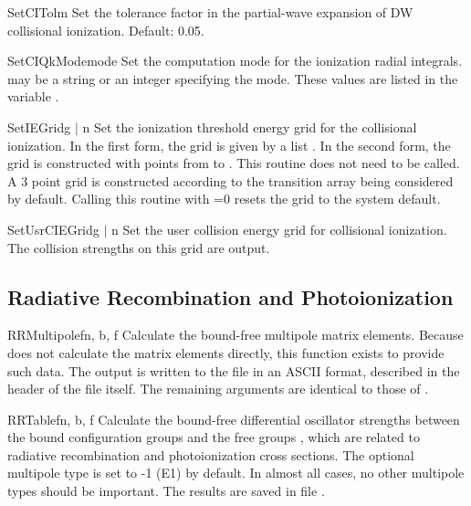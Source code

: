 \begin{fundesc}{SetCITol}{m}
Set the tolerance factor in the partial-wave expansion of DW collisional
ionization. Default: 0.05.
\end{fundesc}

\begin{fundesc}{SetCIQkMode}{mode}
Set the computation mode for the ionization radial integrals.  may
be a string or an integer specifying the mode. These values are listed in the
variable .
\end{fundesc}

\begin{fundesc}{SetIEGrid}{g $\mid$ n}
Set the ionization threshold energy grid for the collisional ionization. In
the first form, the grid is given by a list . In the second
form, the grid is constructed with  points from  to
. This routine does not need to be called. A 3 point grid is
constructed according to the transition array being considered by default.
Calling this routine with =0 resets the grid to the system default.
\end{fundesc}

\begin{fundesc}{SetUsrCIEGrid}{g $\mid$ n}
Set the user collision energy grid for collisional ionization. The collision
strengths on this grid are output. 
\end{fundesc}



\subsection{Radiative Recombination and Photoionization}

\begin{fundesc}{RRMultipole}{fn, b, f}
Calculate the bound-free multipole matrix elements. Because 
does not calculate the matrix elements directly, this function exists to provide
such data. The output is written to the file  in an ASCII format,
described in the header of the file itself. The remaining arguments are
identical to those of .
\end{fundesc}

\begin{fundesc}{RRTable}{fn, b, f}
Calculate the bound-free differential oscillator strengths between the bound
configuration groups  and the free groups , which are related to
radiative recombination and photoionization cross sections. The optional
multipole type  is set to -1 (E1) by default. In almost all cases, no
other multipole types should be important. The results are saved in file
. 
\end{fundesc}


